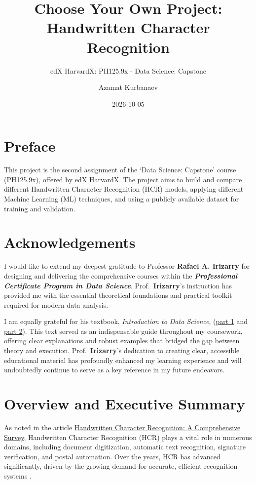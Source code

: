 \documentclass[
]{report}
\title{Choose Your Own Project: Handwritten Character Recognition}
\subtitle{edX HarvardX: PH125.9x - Data Science: Capstone}
\author{Azamat Kurbanaev}
\date{2026-10-05}
\begin{document}
\maketitle

{
\setcounter{tocdepth}{3}
\tableofcontents
}
\chapter*{Preface}\label{preface}

This project is the second assignment of the `Data Science: Capstone' course (PH125.9x), offered by edX HarvardX. The project aims to build and compare different Handwritten Character Recognition (HCR) models, applying different Machine Learning (ML) techniques, and using a publicly available dataset for training and validation.

\chapter*{Acknowledgements}\label{acknowledgements}

I would like to extend my deepest gratitude to Professor \textbf{Rafael A. Irizarry} for designing and delivering the comprehensive courses within the \textbf{\emph{Professional Certificate Program in Data Science}}. Prof.~\textbf{Irizarry}'s instruction has provided me with the essential theoretical foundations and practical toolkit required for modern data analysis.

I am equally grateful for his textbook, \emph{Introduction to Data Science}, (\href{https://rafalab.dfci.harvard.edu/dsbook-part-1/}{part 1}\autocite{IDS1} and \href{https://rafalab.dfci.harvard.edu/dsbook-part-2/}{part 2}\autocite{IDS2}). This text served as an indispensable guide throughout my coursework, offering clear explanations and robust examples that bridged the gap between theory and execution. Prof.~\textbf{Irizarry}'s dedication to creating clear, accessible educational material has profoundly enhanced my learning experience and will undoubtedly continue to serve as a key reference in my future endeavors.

\chapter{Overview and Executive Summary}\label{intro}

As noted in the article \href{https://ieeexplore.ieee.org/document/10420981}{Handwritten Character Recognition: A Comprehensive Survey}, Handwritten Character Recognition (HCR) plays a vital role in numerous domains, including document digitization, automatic text recognition, signature verification, and postal automation. Over the years, HCR has advanced significantly, driven by the growing demand for accurate, efficient recognition systems \autocite{AAASM_SICI10420981}.
\end{document}
